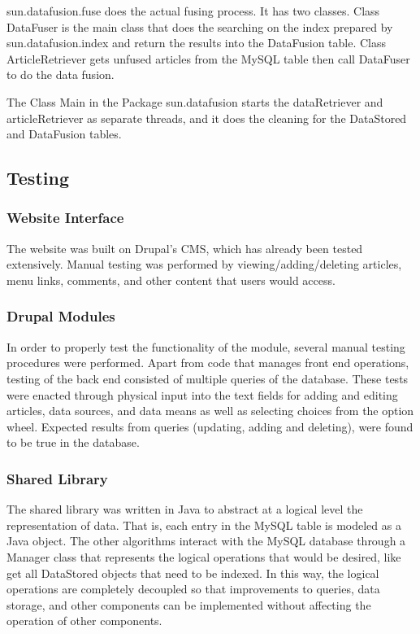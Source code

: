\documentclass[11pt]{article} %
\begin{document}
sun.datafusion.fuse does the actual fusing process. It has two classes. Class DataFuser is the main class that does the searching on the index prepared by sun.datafusion.index and return the results into the DataFusion table. Class ArticleRetriever gets unfused articles from the MySQL table then call DataFuser to do the data fusion.

The Class Main in the Package sun.datafusion starts the dataRetriever and articleRetriever as separate threads, and it does the cleaning for the DataStored and DataFusion tables.  

\subsection{Testing}

\subsubsection{Website Interface}

The website was built on Drupal’s CMS, which has already been tested extensively. Manual testing was performed by viewing/adding/deleting articles, menu links, comments, and other content that users would access.

\subsubsection{Drupal Modules}

In order to properly test the functionality of the module, several manual testing procedures were performed. Apart from code that manages front end operations, testing of the back end consisted of multiple queries of the database. These tests were enacted through physical input into the text fields for adding and editing articles, data sources, and data means as well as selecting choices from the option wheel. Expected results from queries (updating, adding and deleting), were found to be true in the database. 

\subsubsection{Shared Library}

The shared library was written in Java to abstract at a logical level the representation of data. That is, each entry in the MySQL table is modeled as a Java object. The other algorithms interact with the MySQL database through a Manager class that represents the logical operations that would be desired, like get all DataStored objects that need to be indexed. In this way, the logical operations are completely decoupled so that improvements to queries, data storage, and other components can be implemented without affecting the operation of other components.
\end{document}
